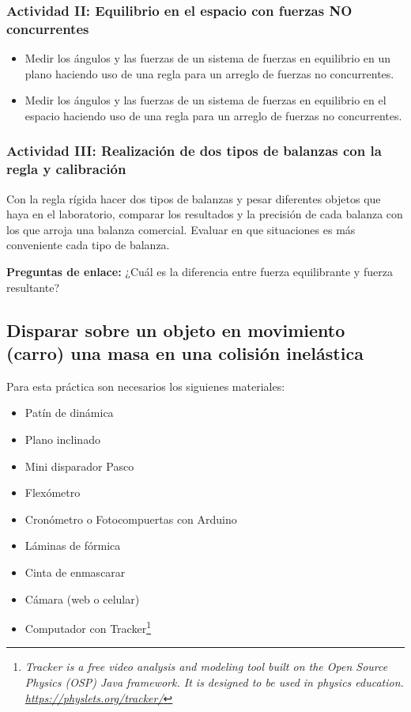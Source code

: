 \documentclass[12pt]{article}
\begin{document}
\subsubsection{Actividad II: Equilibrio en el espacio con fuerzas NO concurrentes}

\begin{itemize}
    \item Medir los ángulos y las fuerzas de un sistema de fuerzas en equilibrio en un plano haciendo uso de una regla para un arreglo de fuerzas no concurrentes.
    \item Medir los ángulos y las fuerzas de un sistema de fuerzas en equilibrio en el espacio haciendo uso de una regla para un arreglo de fuerzas no concurrentes.
\end{itemize}

\subsubsection{Actividad III: Realización de dos tipos de balanzas con la regla y calibración}

Con la regla rígida hacer dos tipos de balanzas y pesar diferentes objetos que haya en el laboratorio, comparar los resultados y la precisión de cada balanza con los que arroja una balanza comercial. Evaluar en que situaciones es más conveniente cada tipo de balanza.

\textbf{Preguntas de enlace:}
¿Cuál es la diferencia entre fuerza equilibrante y fuerza resultante?



\subsection{Disparar sobre un objeto en movimiento (carro) una masa en una colisión inelástica}

Para esta práctica son necesarios los siguienes materiales:
\begin{itemize}
    \item Patín de dinámica
    \item Plano inclinado
    \item Mini disparador Pasco
    \item Flexómetro
    \item Cronómetro o Fotocompuertas con Arduino
    \item L\'aminas de fórmica
    \item Cinta de enmascarar
    \item Cámara (web o celular)
    \item Computador con Tracker\footnote{\it Tracker is a free video analysis and modeling tool built on the Open Source Physics (OSP) Java framework. It is designed to be used in physics education. \url{https://physlets.org/tracker/}} 
\end{itemize}
\end{document}
